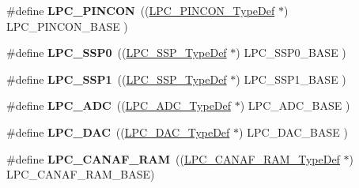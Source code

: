 \begin{DoxyCompactItemize}
\item 
\hypertarget{group___l_p_c17xx___system_gae30bef900c4cccded0c66548b38591f9}{\#define {\bfseries \-L\-P\-C\-\_\-\-P\-I\-N\-C\-O\-N}~((\hyperlink{struct_l_p_c___p_i_n_c_o_n___type_def}{\-L\-P\-C\-\_\-\-P\-I\-N\-C\-O\-N\-\_\-\-Type\-Def}    $\ast$) \-L\-P\-C\-\_\-\-P\-I\-N\-C\-O\-N\-\_\-\-B\-A\-S\-E   )}\label{group___l_p_c17xx___system_gae30bef900c4cccded0c66548b38591f9}

\item 
\hypertarget{group___l_p_c17xx___system_gac213e0325a8e8a972bd2e0dd6ccf353c}{\#define {\bfseries \-L\-P\-C\-\_\-\-S\-S\-P0}~((\hyperlink{struct_l_p_c___s_s_p___type_def}{\-L\-P\-C\-\_\-\-S\-S\-P\-\_\-\-Type\-Def}       $\ast$) \-L\-P\-C\-\_\-\-S\-S\-P0\-\_\-\-B\-A\-S\-E     )}\label{group___l_p_c17xx___system_gac213e0325a8e8a972bd2e0dd6ccf353c}

\item 
\hypertarget{group___l_p_c17xx___system_ga09c4610ada1d9aa18913963cbd1a6e52}{\#define {\bfseries \-L\-P\-C\-\_\-\-S\-S\-P1}~((\hyperlink{struct_l_p_c___s_s_p___type_def}{\-L\-P\-C\-\_\-\-S\-S\-P\-\_\-\-Type\-Def}       $\ast$) \-L\-P\-C\-\_\-\-S\-S\-P1\-\_\-\-B\-A\-S\-E     )}\label{group___l_p_c17xx___system_ga09c4610ada1d9aa18913963cbd1a6e52}

\item 
\hypertarget{group___l_p_c17xx___system_gab6eaf639d3a1eec83583a9e11ab7336f}{\#define {\bfseries \-L\-P\-C\-\_\-\-A\-D\-C}~((\hyperlink{struct_l_p_c___a_d_c___type_def}{\-L\-P\-C\-\_\-\-A\-D\-C\-\_\-\-Type\-Def}       $\ast$) \-L\-P\-C\-\_\-\-A\-D\-C\-\_\-\-B\-A\-S\-E      )}\label{group___l_p_c17xx___system_gab6eaf639d3a1eec83583a9e11ab7336f}

\item 
\hypertarget{group___l_p_c17xx___system_ga5b94918e9ea326d84ab862a5d377903b}{\#define {\bfseries \-L\-P\-C\-\_\-\-D\-A\-C}~((\hyperlink{struct_l_p_c___d_a_c___type_def}{\-L\-P\-C\-\_\-\-D\-A\-C\-\_\-\-Type\-Def}       $\ast$) \-L\-P\-C\-\_\-\-D\-A\-C\-\_\-\-B\-A\-S\-E      )}\label{group___l_p_c17xx___system_ga5b94918e9ea326d84ab862a5d377903b}

\item 
\hypertarget{group___l_p_c17xx___system_gaf02b7bcdc41a045910b3f0bae8a8f4b0}{\#define {\bfseries \-L\-P\-C\-\_\-\-C\-A\-N\-A\-F\-\_\-\-R\-A\-M}~((\hyperlink{struct_l_p_c___c_a_n_a_f___r_a_m___type_def}{\-L\-P\-C\-\_\-\-C\-A\-N\-A\-F\-\_\-\-R\-A\-M\-\_\-\-Type\-Def} $\ast$) \-L\-P\-C\-\_\-\-C\-A\-N\-A\-F\-\_\-\-R\-A\-M\-\_\-\-B\-A\-S\-E)}\label{group___l_p_c17xx___system_gaf02b7bcdc41a045910b3f0bae8a8f4b0}


\end{DoxyCompactItemize}
